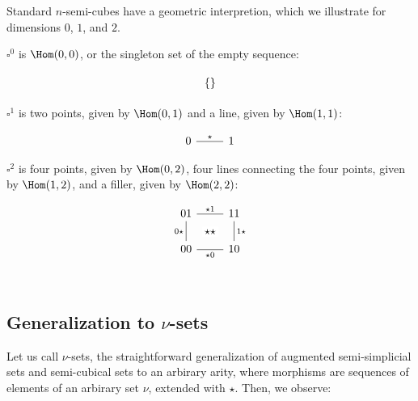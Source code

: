 \documentclass[10pt]{art.cls/art}
\newcommand{\Cube}{\ensuremath{\boldsymbol{\square}}}
\newcommand{\kstar}{{\star}}
\begin{document}
Standard $n$-semi-cubes have a geometric interpretion, which we illustrate for dimensions $0$, $1$, and $2$.

\begin{example}[$\Cube^0$]
  $\Cube^0$ is $\Hom(0, 0)$, or the singleton set of the empty sequence:

  \begin{equation*}
    \begin{tikzcd}
      \{\}
    \end{tikzcd}
  \end{equation*}
\end{example}

\begin{example}[$\Cube^1$]
  $\Cube^1$ is two points, given by $\Hom(0, 1)$ and a line, given by $\Hom(1, 1)$:

  \begin{equation*}
    \begin{tikzcd}
      0 \arrow[r, "\kstar", dash] & 1
    \end{tikzcd}
  \end{equation*}
\end{example}

\begin{example}[$\Cube^2$]
  $\Cube^2$ is four points, given by $\Hom(0, 2)$, four lines connecting the four points, given by $\Hom(1, 2)$, and a filler, given by $\Hom(2, 2)$:

  \begin{equation*}
    \begin{tikzcd}
      01 \arrow[r, dash, "\kstar1"{name=F}] \arrow[d, dash, "0\kstar" left] & 11 \arrow[d, dash, "1\kstar"] \\
      00 \arrow[r, dash, "\kstar0"{name=T, below}] & 10 \\
      \arrow[rightarrow, from=F, to=T, phantom, "\kstar\kstar" description]
    \end{tikzcd}
  \end{equation*}
\end{example}

\subsection{Generalization to \texorpdfstring{$\nu$}{ν}-sets}
Let us call $\nu$-sets, the straightforward generalization of augmented semi-simplicial sets and semi-cubical sets to an arbirary arity, where morphisms are sequences of elements of an arbirary set $\nu$, extended with $\kstar$. Then, we observe:
\end{document}
